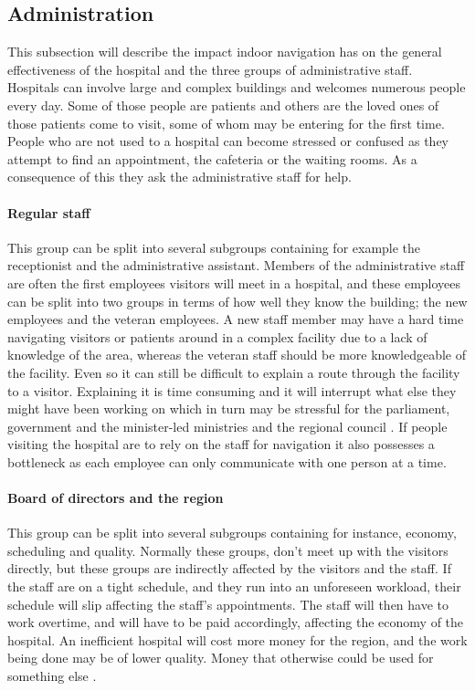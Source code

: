 \subsection{Administration}

This subsection will describe the impact indoor navigation has on the general effectiveness of the hospital and the three groups of administrative staff.\\
Hospitals can involve large and complex buildings \cite{wifi_navigation_ca} and welcomes numerous people every day. Some of those people are patients and others are the loved ones of those patients come to visit, some of whom may be entering for the first time. People who are not used to a hospital can become stressed or confused as they attempt to find an appointment, the cafeteria or the waiting rooms. As a consequence of this they ask the administrative staff for help. \cite{Frivillige_guider}

\paragraph{Regular staff}
This group can be split into several subgroups containing for example the receptionist and the administrative assistant. Members of the administrative staff are often the first employees visitors will meet in a hospital, and these employees can be split into two groups in terms of how well they know the building; the new employees and the veteran employees. A new staff member may have a hard time navigating visitors or patients around in a complex facility due to a lack of knowledge of the area, whereas the veteran staff should be more knowledgeable of the facility. Even so it can still be difficult to explain a route through the facility to a visitor. Explaining it is time consuming and it will interrupt what else they might have been working on which in turn may be stressful for the parliament, government and the minister-led ministries and the regional council \cite{arbejdsmiljo_ca}. If people visiting the hospital are to rely on the staff for navigation it also possesses a bottleneck as each employee can only communicate with one person at a time.

\paragraph{Board of directors and the region}
This group can be split into several subgroups containing for instance, economy, scheduling and quality. Normally these groups, don't meet up with the visitors directly, but these groups are indirectly affected by the visitors and the staff. If the staff are on a tight schedule, and they run into an unforeseen workload, their schedule will slip affecting the staff's appointments. The staff will then have to work overtime, and  will have to be paid accordingly, affecting the economy of the hospital. An inefficient hospital will cost more money for the region, and the work being done may be of lower quality. Money that otherwise could be used for something else \cite{timer_til_at_hjelpe_rundt}.

